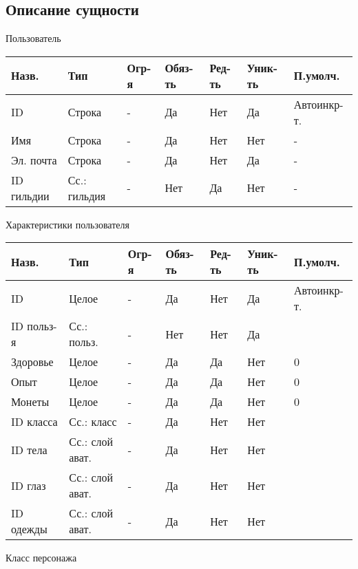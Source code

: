 \documentclass[../document.tex]{subfiles}
\begin{document}
\subsection{Описание сущности}
Пользователь

\begin{tabular}{ | l | l | l | l | l | l | l | }
  \hline
  Назв.      & Тип          & Огр-я & Обяз-ть & Ред-ть & Уник-ть & П.умолч.    \\
  \hline
  ID         & Строка       & -     & Да      & Нет    & Да      & Автоинкр-т. \\
  Имя        & Строка       & -     & Да      & Нет    & Нет     & -           \\
  Эл. почта  & Строка       & -     & Да      & Нет    & Да      & -           \\
  ID гильдии & Сс.: гильдия & -     & Нет     & Да     & Нет     & -           \\
  \hline
\end{tabular}

Характеристики пользователя

\begin{tabular}{ | l | l | l | l | l | l | l | }
  \hline
  Назв.      & Тип             & Огр-я & Обяз-ть & Ред-ть & Уник-ть & П.умолч.    \\
  \hline
  ID         & Целое           & -     & Да      & Нет    & Да      & Автоинкр-т. \\
  ID польз-я & Сс.: польз.     & -     & Нет     & Нет    & Да      &             \\
  Здоровье   & Целое           & -     & Да      & Да     & Нет     & 0           \\
  Опыт       & Целое           & -     & Да      & Да     & Нет     & 0           \\
  Монеты     & Целое           & -     & Да      & Да     & Нет     & 0           \\
  ID класса  & Сс.: класс      & -     & Да      & Нет    & Нет     &             \\
  ID тела    & Сс.: слой ават. & -     & Да      & Нет    & Нет     &             \\
  ID глаз    & Сс.: слой ават. & -     & Да      & Нет    & Нет     &             \\
  ID одежды  & Сс.: слой ават. & -     & Да      & Нет    & Нет     &             \\
  \hline
\end{tabular}

Класс персонажа
\end{document}

